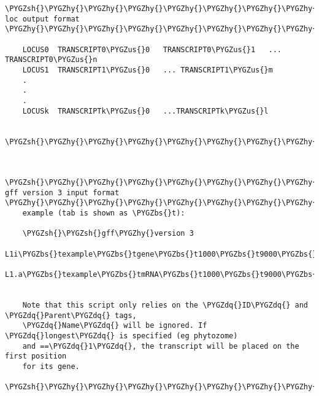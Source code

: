 \documentclass[letterpaper,10pt,english]{sphinxmanual}
\def\PYGZbs{\char`\\}
\def\PYGZus{\char`\_}
\def\PYGZsh{\char`\#}
\def\PYGZhy{\char`\-}
\def\PYGZdq{\char`\"}
\begin{document}
\begin{Verbatim}[commandchars=\\\{\}]
    \PYGZsh{}\PYGZhy{}\PYGZhy{}\PYGZhy{}\PYGZhy{}\PYGZhy{}\PYGZhy{}\PYGZhy{}\PYGZhy{}\PYGZhy{}\PYGZhy{}\PYGZhy{}\PYGZhy{} loc output format \PYGZhy{}\PYGZhy{}\PYGZhy{}\PYGZhy{}\PYGZhy{}\PYGZhy{}\PYGZhy{}\PYGZhy{}\PYGZhy{}\PYGZhy{}\PYGZhy{}\PYGZhy{}\PYGZhy{}\PYGZhy{}\PYGZhy{}\PYGZhy{}\PYGZhy{}\PYGZhy{}\PYGZhy{}\PYGZhy{}\PYGZhy{}\PYGZhy{}\PYGZhy{}\PYGZhy{}\PYGZhy{}\PYGZhy{}\PYGZhy{}\PYGZsh{}

    LOCUS0	TRANSCRIPT0\PYGZus{}0	TRANSCRIPT0\PYGZus{}1	...	TRANSCRIPT0\PYGZus{}n
    LOCUS1	TRANSCRIPT1\PYGZus{}0	...	TRANSCRIPT1\PYGZus{}m
    .
    .
    .
    LOCUSk	TRANSCRIPTk\PYGZus{}0	...TRANSCRIPTk\PYGZus{}l

    \PYGZsh{}\PYGZhy{}\PYGZhy{}\PYGZhy{}\PYGZhy{}\PYGZhy{}\PYGZhy{}\PYGZhy{}\PYGZhy{}\PYGZhy{}\PYGZhy{}\PYGZhy{}\PYGZhy{}\PYGZhy{}\PYGZhy{}\PYGZhy{}\PYGZhy{}\PYGZhy{}\PYGZhy{}\PYGZhy{}\PYGZhy{}\PYGZhy{}\PYGZhy{}\PYGZhy{}\PYGZhy{}\PYGZhy{}\PYGZhy{}\PYGZhy{}\PYGZhy{}\PYGZhy{}\PYGZhy{}\PYGZhy{}\PYGZhy{}\PYGZhy{}\PYGZhy{}\PYGZhy{}\PYGZhy{}\PYGZhy{}\PYGZhy{}\PYGZhy{}\PYGZhy{}\PYGZhy{}\PYGZhy{}\PYGZhy{}\PYGZhy{}\PYGZhy{}\PYGZhy{}\PYGZhy{}\PYGZhy{}\PYGZhy{}\PYGZhy{}\PYGZhy{}\PYGZhy{}\PYGZhy{}\PYGZhy{}\PYGZhy{}\PYGZhy{}\PYGZhy{}\PYGZhy{}\PYGZsh{}


    \PYGZsh{}\PYGZhy{}\PYGZhy{}\PYGZhy{}\PYGZhy{}\PYGZhy{}\PYGZhy{}\PYGZhy{}\PYGZhy{} gff version 3 input format \PYGZhy{}\PYGZhy{}\PYGZhy{}\PYGZhy{}\PYGZhy{}\PYGZhy{}\PYGZhy{}\PYGZhy{}\PYGZhy{}\PYGZhy{}\PYGZhy{}\PYGZhy{}\PYGZhy{}\PYGZhy{}\PYGZhy{}\PYGZhy{}\PYGZhy{}\PYGZhy{}\PYGZhy{}\PYGZhy{}\PYGZhy{}\PYGZhy{}\PYGZsh{}
    example (tab is shown as \PYGZbs{}t):

    \PYGZsh{}\PYGZsh{}gff\PYGZhy{}version 3
    L1i\PYGZbs{}texample\PYGZbs{}tgene\PYGZbs{}t1000\PYGZbs{}t9000\PYGZbs{}t.\PYGZbs{}t+\PYGZbs{}t.\PYGZbs{}tID=L1;Name=L1;Note=example
    L1.a\PYGZbs{}texample\PYGZbs{}tmRNA\PYGZbs{}t1000\PYGZbs{}t9000\PYGZbs{}t.\PYGZbs{}t+\PYGZbs{}t.\PYGZbs{}tID=L1.a;Parent=L1;Name=L1.a


    Note that this script only relies on the \PYGZdq{}ID\PYGZdq{} and \PYGZdq{}Parent\PYGZdq{} tags,
    \PYGZdq{}Name\PYGZdq{} will be ignored. If \PYGZdq{}longest\PYGZdq{} is specified (eg phytozome)
    and ==\PYGZdq{}1\PYGZdq{}, the transcript will be placed on the first position
    for its gene.
    \PYGZsh{}\PYGZhy{}\PYGZhy{}\PYGZhy{}\PYGZhy{}\PYGZhy{}\PYGZhy{}\PYGZhy{}\PYGZhy{}\PYGZhy{}\PYGZhy{}\PYGZhy{}\PYGZhy{}\PYGZhy{}\PYGZhy{}\PYGZhy{}\PYGZhy{}\PYGZhy{}\PYGZhy{}\PYGZhy{}\PYGZhy{}\PYGZhy{}\PYGZhy{}\PYGZhy{}\PYGZhy{}\PYGZhy{}\PYGZhy{}\PYGZhy{}\PYGZhy{}\PYGZhy{}\PYGZhy{}\PYGZhy{}\PYGZhy{}\PYGZhy{}\PYGZhy{}\PYGZhy{}\PYGZhy{}\PYGZhy{}\PYGZhy{}\PYGZhy{}\PYGZhy{}\PYGZhy{}\PYGZhy{}\PYGZhy{}\PYGZhy{}\PYGZhy{}\PYGZhy{}\PYGZhy{}\PYGZhy{}\PYGZhy{}\PYGZhy{}\PYGZhy{}\PYGZhy{}\PYGZhy{}\PYGZhy{}\PYGZhy{}\PYGZhy{}\PYGZhy{}\PYGZhy{}\PYGZsh{}


\end{Verbatim}
\end{document}
